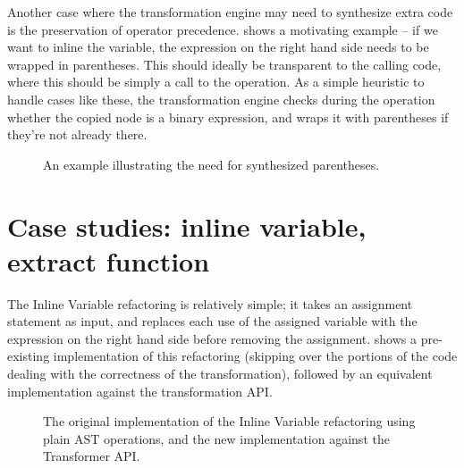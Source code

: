 Another case where the transformation engine may need to synthesize extra code
is the preservation of operator precedence.  shows
a motivating example -- if we want to inline the  variable, the
expression on the right hand side needs to be wrapped in parentheses. This
should ideally be transparent to the calling code, where this should be simply
a call to the  operation. As a simple heuristic to handle cases
like these, the transformation engine checks during the  operation
whether the copied node is a binary expression, and wraps it with parentheses
if they're not already there.

\begin{figure}
\begin{minipage}{0.5\linewidth}

\end{minipage}
\hfill \hspace{.3cm} \hfill
\begin{minipage}{0.5\linewidth}

\end{minipage}
\caption{An example illustrating the need for synthesized parentheses.}
\label{Fig:NeedParens}
\end{figure}

\section{Case studies: inline variable, extract function}

The Inline Variable refactoring is relatively simple; it takes an assignment
statement as input, and replaces each use of the assigned variable with the
expression on the right hand side before removing the assignment.
 shows a pre-existing implementation of this
refactoring (skipping over the portions of the code dealing with the
correctness of the transformation), followed by an equivalent implementation against
the transformation API.


\begin{figure}
\begin{minipage}{\linewidth}

\end{minipage}
\begin{minipage}{\linewidth}

\end{minipage}
\caption{The original implementation of the Inline Variable refactoring using plain
AST operations, and the new implementation against the Transformer API.}
\label{Fig:InlineVariableComparison}
\end{figure}

